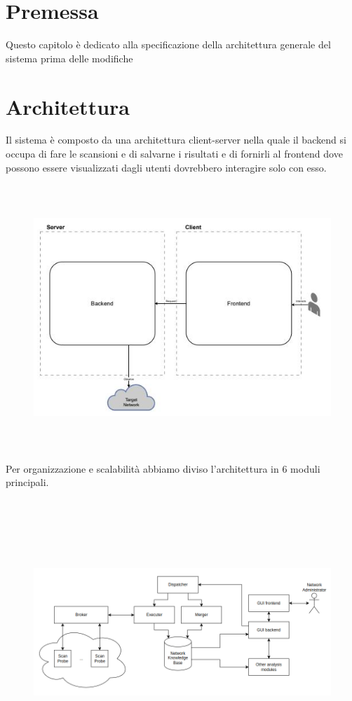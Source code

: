 \documentclass[target=bach,aauheader=,style=]{thud}
\begin{document}
\section{Premessa}
Questo capitolo è dedicato alla specificazione della architettura generale del sistema prima delle modifiche 

\section{Architettura}
Il sistema è composto da una architettura client-server nella quale il backend si occupa di fare le scansioni e di salvarne i risultati e di fornirli al frontend dove possono essere visualizzati dagli utenti dovrebbero interagire solo con esso. 

\begin{figure}[h]
\includegraphics[width=15cm, height=10cm]{client_server}
\centering
\end{figure}

Per organizzazione e scalabilità abbiamo diviso l'architettura in 6 moduli principali.

\begin{figure}[h]
\includegraphics[width=15cm, height=10cm]{moduli_new}
\centering
\end{figure}
\end{document}
